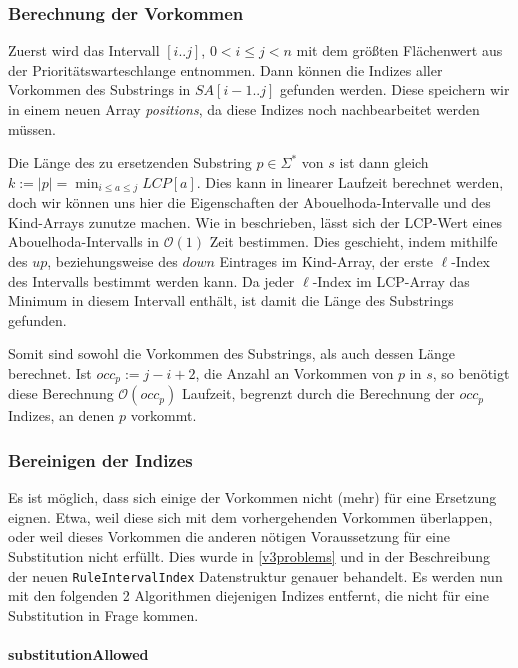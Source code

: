 \subsubsection{Berechnung der Vorkommen}

Zuerst wird das Intervall $[i..j]$, $0 < i \leq j < n$ mit dem größten Flächenwert aus der Prioritätswarteschlange entnommen. Dann können die Indizes aller Vorkommen des Substrings in $SA[i-1..j]$ gefunden werden. Diese speichern wir in einem neuen Array \emph{positions}, da diese Indizes noch nachbearbeitet werden müssen.

Die Länge des zu ersetzenden Substring $p \in \Sigma^*$ von $s$ ist dann gleich $k := |p| = \min_{i \leq a \leq j} LCP[a]$.
Dies kann in linearer Laufzeit berechnet werden, doch wir können uns hier die Eigenschaften der Abouelhoda-Intervalle und des Kind-Arrays zunutze machen. 
Wie in \cite{abouelhoda_optimal_2002} beschrieben, lässt sich der LCP-Wert eines Abouelhoda-Intervalls in $\mathcal{O}(1)$ Zeit bestimmen. Dies geschieht, indem mithilfe des $up$, beziehungsweise des $down$ Eintrages im Kind-Array, der erste $\ell$-Index des Intervalls bestimmt werden kann. Da jeder $\ell$-Index im LCP-Array das Minimum in diesem Intervall enthält, ist damit die Länge des Substrings gefunden.

Somit sind sowohl die Vorkommen des Substrings, als auch dessen Länge berechnet. Ist $occ_p := j - i + 2$, die Anzahl an Vorkommen von $p$ in $s$, so benötigt diese Berechnung $\mathcal{O}(occ_p)$ Laufzeit, begrenzt durch die Berechnung der $occ_p$ Indizes, an denen $p$ vorkommt.

\subsubsection{Bereinigen der Indizes}

Es ist möglich, dass sich einige der Vorkommen nicht (mehr) für eine Ersetzung eignen. 
Etwa, weil diese sich mit dem vorhergehenden Vorkommen überlappen, oder weil dieses Vorkommen die anderen nötigen Voraussetzung für eine Substitution nicht erfüllt. 
Dies wurde in \autoref{v3problems} und in der Beschreibung der neuen \texttt{RuleIntervalIndex} Datenstruktur genauer behandelt. Es werden nun mit den folgenden 2 Algorithmen diejenigen Indizes entfernt, die nicht für eine Substitution in Frage kommen.

\paragraph{substitutionAllowed}

